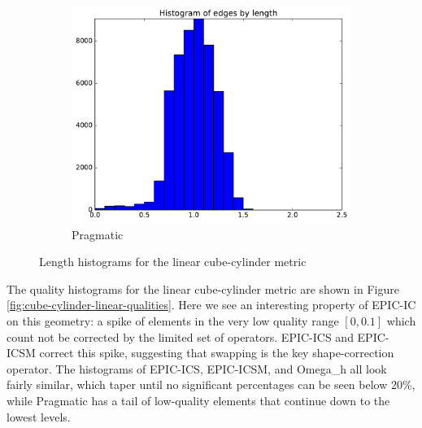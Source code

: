 \documentclass[3p,times,procedia,number]{elsarticle}
\begin{document}
\begin{figure}
\begin{subfigure}{.4\textwidth}
\includegraphics[width=\textwidth]{pragmatic-cube-cylinder-linear-length.pdf}
\caption{Pragmatic}
\end{subfigure}
\caption{Length histograms for the linear cube-cylinder metric}
\label{fig:cube-cylinder-linear-lengths}
\end{figure}

The quality histograms for the linear cube-cylinder metric
are shown in Figure \ref{fig:cube-cylinder-linear-qualities}.
Here we see an interesting property of EPIC-IC on this geometry:
a spike of elements in the very low quality range $[0,0.1]$
which count not be corrected by the limited set of operators.
EPIC-ICS and EPIC-ICSM correct this spike, suggesting that
swapping is the key shape-correction operator.
The histograms of EPIC-ICS, EPIC-ICSM, and Omega\_h all look fairly
similar, which taper until no significant percentages can be
seen below 20\%, while Pragmatic has a tail of low-quality
elements that continue down to the lowest levels.
\end{document}
